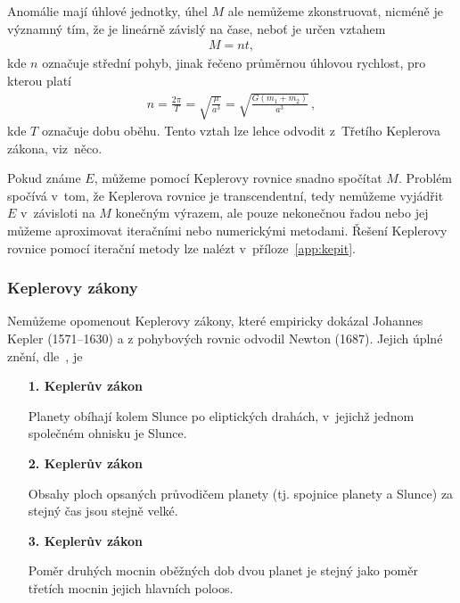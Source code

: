 \documentclass[A4paper, 12pt, oneside]{book}
\begin{document}
Anomálie mají úhlové jednotky, úhel $M$ ale nemůžeme zkonstruovat, nicméně je významný tím, že je lineárně závislý na čase, neboť je určen vztahem 
\begin{align} \label{eq:M}
	M=nt,
\end{align}
kde $n$ označuje střední pohyb, jinak řečeno průměrnou úhlovou rychlost, pro kterou platí
\begin{align} \label{eq:n}
	n=\frac{2\pi}{T}=\sqrt{\frac{\mu}{a^3}}=\sqrt{\frac{G(m_1+m_2)}{a^3}}\,,
\end{align}
kde $T$ označuje dobu oběhu. Tento vztah lze lehce odvodit z~Třetího Keplerova zákona, viz~něco.

Pokud známe $E$, můžeme pomocí Keplerovy rovnice snadno spočítat $M$. Problém spočívá v~tom, že Keplerova rovnice je transcendentní, tedy nemůžeme vyjádřit $E$ v~závisloti na $M$ konečným výrazem, ale pouze nekonečnou řadou nebo jej můžeme aproximovat iteračními nebo numerickými metodami. Řešení Keplerovy rovnice pomocí iterační metody lze nalézt v~příloze~\ref{app:kepit}.
\subsubsection{Keplerovy zákony}

Nemůžeme opomenout Keplerovy zákony, které empiricky dokázal Johannes Kepler (1571--1630) a z pohybových rovnic odvodil Newton (1687). Jejich úplné znění, dle~\cite{wiki:kepzak}, je 
\begin{enumerate}[wide]
	\item[\textbf{1. Keplerův zákon}] \ 

Planety obíhají kolem Slunce po eliptických drahách, v~jejichž jednom společném ohnisku je Slunce.
	\item[\textbf{2. Keplerův zákon}] \ 

Obsahy ploch opsaných průvodičem planety (tj. spojnice planety a Slunce) za stejný čas jsou stejně velké.
	\item[\textbf{3. Keplerův zákon}] \ 

Poměr druhých mocnin oběžných dob dvou planet je stejný jako poměr třetích mocnin jejich hlavních poloos.
\end{enumerate}
\end{document}
